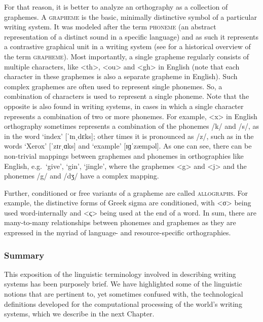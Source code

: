 For that reason, it is better to analyze an orthography as a collection of
graphemes. A \textsc{grapheme} is the basic, minimally distinctive symbol of a
particular writing system. It was modeled
after the term \textsc{phoneme} (an abstract representation of
a distinct sound in a specific language) and as such it represents a contrastive graphical unit in a
writing system (see \citealp{Kohrt1986} for a historical overview of the term
\textsc{grapheme}). Most importantly, a single grapheme regularly consists of multiple
characters, like <th>, <ou> and <gh> in English (note that each character in
these graphemes is also a separate grapheme in English). Such complex graphemes
are often used to represent single phonemes. So, a combination of characters is
used to represent a single phoneme. Note that the opposite is also found in
writing systems, in cases in which a single character represents a combination
of two or more phonemes. For example, <x> in English orthography sometimes represents a
combination of the phonemes /k/ and /s/, as in the word `index' [ˈɪnˌdɛks]; other times 
it is pronounced as /z/, such as in the words `Xerox' [ˈzɪrˌɑks] and `example' [ɪɡˈzæmpəl]. 
As one can see, there can be non-trivial mappings between graphemes and phonemes in 
orthographies like English, e.g.\ `give', `gin', `jingle', where the graphemes 
<g> and <j> and the phonemes /g/ and /dʒ/ have a complex mapping.

Further, conditioned or free variants of a grapheme are called
\textsc{allographs}. For example, the distinctive forms of Greek sigma are
conditioned, with <σ> being used word-internally and <ς> being used at the end
of a word. In sum, there are many-to-many relationships between phonemes and
graphemes as they are expressed in the myriad of language- and resource-specific
orthographies.

\subsubsection*{Summary}

\noindent This exposition of the linguistic terminology involved in describing writing
systems has been purposely brief. We have highlighted some of the linguistic
notions that are pertinent to, yet sometimes confused with, the technological
definitions developed for the computational processing of the world's writing
systems, which we describe in the next Chapter.


